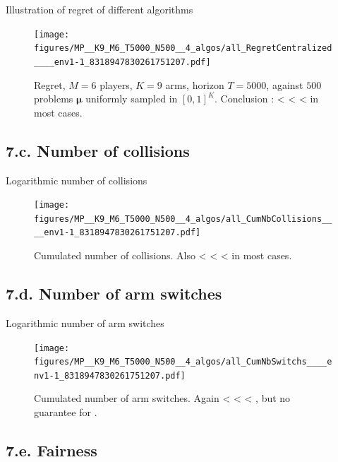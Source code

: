 \documentclass[12pt,english,ignorenonframetext,]{beamer}
\begin{document}
\begin{frame}[plain]{Illustration of regret of different algorithms}

\begin{figure}[h!]
\centering
\texttt{[image: figures/MP\_\_K9\_M6\_T5000\_N500\_\_4\_algos/all\_RegretCentralized\_\_\_\_env1-1\_8318947830261751207.pdf]}
\caption{\footnotesize{Regret, $M=6$ players, $K=9$ arms, horizon $T=5000$, against $500$ problems $\boldsymbol{\mu}$ uniformly sampled in $[0,1]^K$. \newline Conclusion : \textcolor{blue}{\rhoRand{}} < \textcolor{red}{\RandTopM{}} < \textcolor{bluegreen}{\Selfish{}} < \textcolor{yellowgreen}{\MCTopM{}} in most cases.}}
\end{figure}

\subsection{\hfill{}7.c. Number of collisions\hfill{}}

\end{frame}

\begin{frame}[plain]{Logarithmic number of collisions}

\begin{figure}[h!]
\centering
\texttt{[image: figures/MP\_\_K9\_M6\_T5000\_N500\_\_4\_algos/all\_CumNbCollisions\_\_\_\_env1-1\_8318947830261751207.pdf]}
\caption{\footnotesize{Cumulated number of collisions. Also \textcolor{blue}{\rhoRand{}} < \textcolor{red}{\RandTopM{}} < \textcolor{bluegreen}{\Selfish{}} < \textcolor{yellowgreen}{\MCTopM{}} in most cases.}}
\end{figure}

\subsection{\hfill{}7.d. Number of arm switches\hfill{}}

\end{frame}

\begin{frame}[plain]{Logarithmic number of arm switches}

\begin{figure}[h!]
\centering
\texttt{[image: figures/MP\_\_K9\_M6\_T5000\_N500\_\_4\_algos/all\_CumNbSwitchs\_\_\_\_env1-1\_8318947830261751207.pdf]}
\caption{\footnotesize{Cumulated number of arm switches. Again \textcolor{blue}{\rhoRand{}} < \textcolor{red}{\RandTopM{}} < \textcolor{bluegreen}{\Selfish{}} < \textcolor{yellowgreen}{\MCTopM{}}, but no guarantee for \textcolor{blue}{\rhoRand{}}.}}
\end{figure}

\subsection{\hfill{}7.e. Fairness\hfill{}}

\end{frame}
\end{document}
